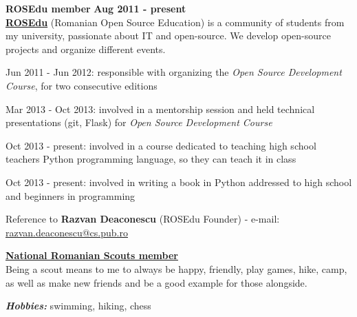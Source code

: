 \documentclass[margin,line]{resume}
\begin{document}
\begin{resume}
    \vspace{1.2mm}\textbf{ROSEdu member} \hfill \textbf{Aug 2011 - present} \vspace{1.5mm}\\
	\href{http://rosedu.org/}{\textbf{ROSEdu}} (Romanian Open Source Education) is a community of 
	students from my university, passionate about IT and open-source. We develop 
	open-source projects and organize different events.\vspace{1mm}
	\begin{list2}
        \item Jun 2011 - Jun 2012: responsible with organizing the \textit{Open Source Development Course}, for two consecutive editions
        \item Mar 2013 - Oct 2013: involved in a mentorship session and held technical presentations (git, Flask) for \textit{Open Source Development Course}
        \item Oct 2013 - present: involved in a course dedicated to teaching high school teachers Python programming language, so they can teach it in class
        \item Oct 2013 - present: involved in writing a book in Python addressed to high school and beginners in programming
	\end{list2}\vspace{-3mm}
	\small{Reference to \textbf{Razvan Deaconescu} (ROSEdu Founder)
		- e-mail: \href{mailto:razvan.deaconescu@cs.pub.ro}{razvan.deaconescu@cs.pub.ro}}

	\href{http://www.scoutpanaitescu.ro/}{\textbf{National Romanian Scouts member}}\vspace{1mm}\\
	Being a scout means to me to always be happy, friendly, play games, hike, camp, as well as make new friends and be a good example for those alongside.

	\textbf{\textit{Hobbies:}} swimming, hiking, chess



\end{resume}
\end{document}
